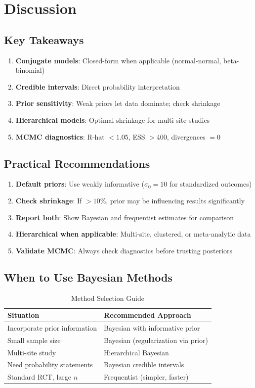 \section{Discussion}

\subsection{Key Takeaways}

\begin{enumerate}
\item \textbf{Conjugate models}: Closed-form when applicable (normal-normal, beta-binomial)
\item \textbf{Credible intervals}: Direct probability interpretation
\item \textbf{Prior sensitivity}: Weak priors let data dominate; check shrinkage
\item \textbf{Hierarchical models}: Optimal shrinkage for multi-site studies
\item \textbf{MCMC diagnostics}: R-hat $< 1.05$, ESS $> 400$, divergences $= 0$
\end{enumerate}

\subsection{Practical Recommendations}

\begin{enumerate}
\item \textbf{Default priors}: Use weakly informative ($\sigma_0 = 10$ for standardized outcomes)
\item \textbf{Check shrinkage}: If $> 10\%$, prior may be influencing results significantly
\item \textbf{Report both}: Show Bayesian and frequentist estimates for comparison
\item \textbf{Hierarchical when applicable}: Multi-site, clustered, or meta-analytic data
\item \textbf{Validate MCMC}: Always check diagnostics before trusting posteriors
\end{enumerate}

\subsection{When to Use Bayesian Methods}

\begin{table}[h]
\centering
\caption{Method Selection Guide}
\begin{tabular}{ll}
\toprule
Situation & Recommended Approach \\
\midrule
Incorporate prior information & Bayesian with informative prior \\
Small sample size & Bayesian (regularization via prior) \\
Multi-site study & Hierarchical Bayesian \\
Need probability statements & Bayesian credible intervals \\
Standard RCT, large $n$ & Frequentist (simpler, faster) \\
\bottomrule
\end{tabular}
\end{table}


